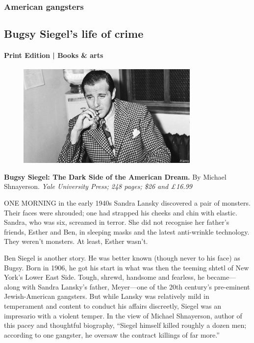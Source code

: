 \documentclass{article}
\begin{document}
\subsubsection{American gangsters }
\subsection{Bugsy Siegel's life of crime }
\paragraph{Print Edition | Books \& arts  \quad \color{gray}{Mar 25th 2021 }}
\begin{figure}[h]
\centering
\includegraphics[width=0.8\textwidth]{images/20210327_bkp002.jpg}
\end{figure}
\textbf{Bugsy Siegel: The Dark Side of the American Dream.} By Michael Shnayerson. \emph{Yale University Press; 248 pages; \$26 and £16.99} 

\lettrine{O}NE MORNING in the early 1940s Sandra Lansky discovered a pair of monsters. Their faces were shrouded; one had strapped his cheeks and chin with elastic. Sandra, who was six, screamed in terror. She did not recognise her father's friends, Esther and Ben, in sleeping masks and the latest anti-wrinkle technology. They weren't monsters. At least, Esther wasn't. 

Ben Siegel is another story. He was better known (though never to his face) as Bugsy. Born in 1906, he got his start in what was then the teeming shtetl of New York's Lower East Side. Tough, shrewd, handsome and fearless, he became---along with Sandra Lansky's father, Meyer---one of the 20th century's pre-eminent Jewish-American gangsters. But while Lansky was relatively mild in temperament and content to conduct his affairs discreetly, Siegel was an impresario with a violent temper. In the view of Michael Shnayerson, author of this pacey and thoughtful biography, ``Siegel himself killed roughly a dozen men; according to one gangster, he oversaw the contract killings of far more.'' 
\end{document}

